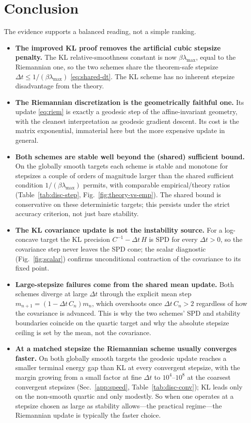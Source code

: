 \documentclass[11pt]{article}
\begin{document}
\section{Conclusion}\label{sec:conclusion}

The evidence supports a balanced reading, not a simple ranking.
\begin{itemize}\itemsep4pt
  \item \textbf{The improved KL proof removes the artificial cubic stepsize
  penalty.} The KL relative-smoothness constant is now $\beta\lambda_{\max}$, equal
  to the Riemannian one, so the two schemes share the theorem-safe stepsize
  $\Delta t\le1/(\beta\lambda_{\max})$ \eqref{eq:shared-dt}. The KL scheme has no
  inherent stepsize disadvantage from the theory.
  \item \textbf{The Riemannian discretization is the geometrically faithful one.}
  Its update \eqref{eq:riem} is exactly a geodesic step of the affine-invariant
  geometry, with the cleanest interpretation as geodesic gradient descent. Its cost
  is the matrix exponential, immaterial here but the more expensive update in
  general.
  \item \textbf{Both schemes are stable well beyond the (shared) sufficient
  bound.} On the globally smooth targets each scheme is stable and monotone for
  stepsizes a couple of orders of magnitude larger than the shared sufficient
  condition $1/(\beta\lambda_{\max})$ permits, with comparable empirical/theory
  ratios (Table~\ref{tab:disc-step}, Fig.~\ref{fig:theory-vs-emp}). The shared
  bound is conservative on these deterministic targets; this persists under the
  strict accuracy criterion, not just bare stability.
  \item \textbf{The KL covariance update is not the instability source.} For a
  log-concave target the KL precision $C^{-1}-\Delta t\,H$ is SPD for every
  $\Delta t>0$, so the covariance step never leaves the SPD cone; the scalar
  diagnostic (Fig.~\ref{fig:scalar}) confirms unconditional contraction of the
  covariance to its fixed point.
  \item \textbf{Large-stepsize failures come from the shared mean update.} Both
  schemes diverge at large $\Delta t$ through the explicit mean step
  $m_{n+1}=(1-\Delta t\,C_n)m_n$, which overshoots once $\Delta t\,C_n>2$
  regardless of how the covariance is advanced. This is why the two schemes' SPD
  and stability boundaries coincide on the quartic target and why the absolute
  stepsize ceiling is set by the mean, not the covariance.
  \item \textbf{At a matched stepsize the Riemannian scheme usually converges
  faster.} On both globally smooth targets the geodesic update reaches a smaller
  terminal energy gap than KL at every convergent stepsize, with the margin growing
  from a small factor at fine $\Delta t$ to $10^{4}$--$10^{8}$ at the coarsest
  convergent stepsizes (Sec.~\ref{app:speed}, Table~\ref{tab:disc-conv}); KL leads
  only on the non-smooth quartic and only modestly. So when one operates at a
  stepsize chosen as large as stability allows---the practical regime---the
  Riemannian update is typically the faster choice.
\end{itemize}
\end{document}
